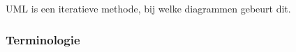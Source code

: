 \begin{question}
UML is een iteratieve methode, bij welke diagrammen gebeurt dit.
\end{question}

\begin{solution}[print]

\end{solution}

\subsubsection{Terminologie}


